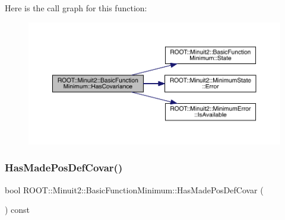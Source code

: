 Here is the call graph for this function\+:
\nopagebreak
\begin{figure}[H]
\begin{center}
\leavevmode
\includegraphics[width=350pt]{de/d25/classROOT_1_1Minuit2_1_1BasicFunctionMinimum_ac876224368add09ceab711d3515fd959_cgraph}
\end{center}
\end{figure}
\mbox{\label{classROOT_1_1Minuit2_1_1BasicFunctionMinimum_a57562fcd9f78a8e4f9a425c8f80f1d83}} 
\subsubsection{\texorpdfstring{HasMadePosDefCovar()}{HasMadePosDefCovar()}\hspace{0.1cm}{\footnotesize\ttfamily [1/3]}}
{\footnotesize\ttfamily bool R\+O\+O\+T\+::\+Minuit2\+::\+Basic\+Function\+Minimum\+::\+Has\+Made\+Pos\+Def\+Covar (\begin{DoxyParamCaption}{ }\end{DoxyParamCaption}) const\hspace{0.3cm}{\ttfamily [inline]}}

